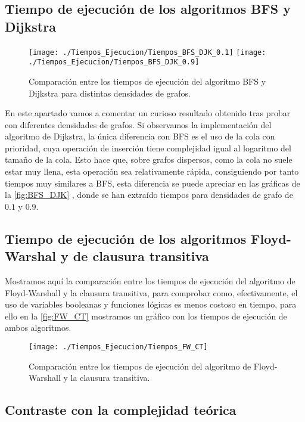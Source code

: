 \subsection{Tiempo de ejecución de los algoritmos BFS y Dijkstra}

\begin{figure}[htb]
	\centering
	\texttt{[image: ./Tiempos\_Ejecucion/Tiempos\_BFS\_DJK\_0.1]}
	\texttt{[image: ./Tiempos\_Ejecucion/Tiempos\_BFS\_DJK\_0.9]}
	
	\caption{Comparación entre los tiempos de ejecución del algoritmo BFS y Dijkstra para distintas densidades de grafos.}
	\label{fig:BFS_DJK}
\end{figure}

En este apartado vamos a comentar un curioso resultado obtenido tras probar con diferentes densidades de grafos. Si observamos la implementación del algoritmo de Dijkstra, la única diferencia con BFS es el uso de la cola con prioridad, cuya operación de inserción tiene complejidad igual al logaritmo del tamaño de la cola. Esto hace que, sobre grafos dispersos, como la cola no suele estar muy llena, esta operación sea relativamente rápida, consiguiendo por tanto tiempos muy similares a BFS, esta diferencia se puede apreciar en las gráficas de la \autoref{fig:BFS_DJK} , donde se han extraído tiempos para densidades de grafo de $0.1$ y $0.9$.

\subsection{Tiempo de ejecución de los algoritmos Floyd-Warshal y de clausura transitiva}

Mostramos aquí la comparación entre los tiempos de ejecución del algoritmo de Floyd-Warshall y la clausura transitiva, para comprobar como, efectivamente, el uso de variables booleanas y funciones lógicas es menos costoso en tiempo, para ello en la \autoref{fig:FW_CT} mostramos un gráfico con los tiempos de ejecución de ambos algoritmos.

\begin{figure}[htb]
	\centering
	\texttt{[image: ./Tiempos\_Ejecucion/Tiempos\_FW\_CT]}
	
	\caption{Comparación entre los tiempos de ejecución del algoritmo de Floyd-Warshall y la clausura transitiva.}
	\label{fig:FW_CT}
\end{figure}

\subsection{Contraste con la complejidad teórica}

